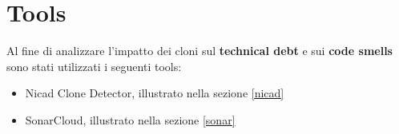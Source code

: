 \chapter{Tools}\label{cap3}
Al fine di analizzare l'impatto dei cloni sul \textbf{technical debt} e sui \textbf{code smells} sono stati utilizzati i seguenti tools:
\begin{itemize}
\item Nicad Clone Detector, illustrato nella sezione \ref{nicad}
\item SonarCloud, illustrato nella sezione \ref{sonar}
\end{itemize}
 \label{nicad}


